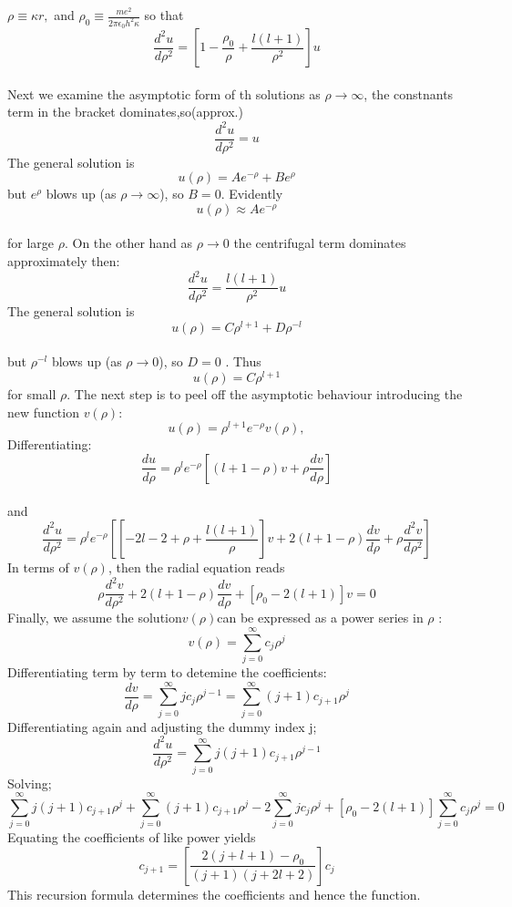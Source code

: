 \documentclass[12pt,a4paper]{report}
\begin{document}
$\rho \equiv \kappa r, $ and $   \rho_0 \equiv \frac{me^2}{2\pi\epsilon_0h^2\kappa}$ 
so that
$$ \frac{d^2u}{d\rho^2}=\left[1-\frac{\rho_0}{\rho} + \frac{l(l+1)}{\rho^2}\right]u$$\\
Next we examine the asymptotic form of th solutions as $ \rho \rightarrow \infty$, the constnants term in the bracket dominates,so(approx.)\\
$$ \frac{d^2u}{d\rho^2}=u$$ 
The general solution is
$$u(\rho) =Ae^{-\rho} + Be^\rho$$ 
but $e^\rho$ blows up (as $\rho\rightarrow \infty$), so $B=0$. Evidently \\
$$u(\rho)\approx Ae^{-\rho}$$\\
for large $\rho$. On the other hand as $\rho \rightarrow 0$ the centrifugal term dominates approximately then:\\
$$ \frac{d^2u}{d\rho^2}= \frac{l(l+1)}{\rho^2}u$$ 
The general solution is 
$$u(\rho)=C\rho^{l+1}+ D\rho^{-l}$$\\ 
but $\rho^{-l}$ blows up (as $\rho \rightarrow 0$), so $D=0$ . Thus \\ 
$$u(\rho)=C\rho^{l+1}$$
for small $\rho$.  
The next step is to peel off the asymptotic behaviour introducing the new function $v(\rho) $:
$$u(\rho)=\rho^{l+1}e^{-\rho}v(\rho),$$
Differentiating:
$$ \frac{du}{d\rho}=\rho^l e^{-\rho}\left[(l+1-\rho)v + \rho\frac{dv}{d\rho}\right]$$ \\ 
and 
$$\frac{d^2u}{d\rho^2}=\rho^l e^{-\rho}\left[[-2l-2+\rho+\frac{l(l+1)}{\rho}]v +2( l+1-\rho) \frac{dv}{d\rho}+\rho\frac{d^2v}{d\rho^2}\right]$$ 
In terms of $v(\rho)$, then the radial equation reads
$$\rho\frac{d^2v}{d\rho^2}+ 2(l+1-\rho)\frac{dv}{d\rho}+[\rho_0-2(l+1)]v=0$$
Finally, we assume the solution$ v(\rho) $can be expressed as a power series in $\rho$ :
$$v(\rho)=\sum_{j=0}^{\infty}c_j\rho^j$$
Differentiating term by term to detemine the coefficients: 
$$\frac{dv}{d\rho} = \sum_{j=0}^{\infty}j c_j\rho^{j-1} = \sum_{j=0}^{\infty}(j+1)c_{j+1}\rho^j$$ 
Differentiating again and adjusting the dummy index j; 
$$\frac{d^2u}{d\rho^2}=\sum_{j=0}^{\infty}j(j+1)c_{j+1}\rho^{j-1}$$
Solving;
$$\sum_{j=0}^{\infty}j(j+1)c_{j+1}\rho^j+\sum_{j=0}^{\infty}(j+1)c_{j+1}\rho^j-2\sum_{j=0}^{\infty}jc_{j}\rho^j+ [\rho_0-2(l+1)]\sum_{j=0}^{\infty}c_j\rho^j=0$$ 
Equating the coefficients of like power yields 
$$c_{j+1}=\left[\frac{2(j+l+1)-\rho_0}{(j+1)(j+2l+2)}\right]c_j$$ 
This recursion formula determines the coefficients and hence the function. \\ \\%
\end{document}

